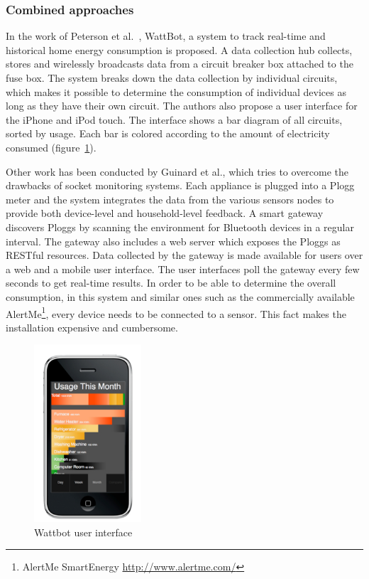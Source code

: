 \subsubsection{Combined approaches}
In the work of Peterson et al.~\cite{Petersen_2009}, WattBot, a system to track real-time and historical home energy consumption is proposed.  
A data collection hub collects, stores and wirelessly broadcasts data from a circuit breaker box attached to the fuse box. The system breaks down the data collection by individual circuits, which makes it possible to determine the consumption of individual devices as long as they have their own circuit. The authors also propose a user interface for the iPhone and iPod touch. The interface shows a bar diagram of all circuits, sorted by usage. Each bar is colored according to the amount of electricity consumed (figure~\ref{wattbot}).

Other work has been conducted by Guinard et al.\cite{weiss:inprocMUM:2010}, which tries to overcome the drawbacks of socket monitoring systems. Each appliance is plugged into a Plogg meter and the system integrates the data from the various sensors nodes to provide both device-level and household-level feedback. A smart gateway discovers Ploggs by scanning the environment for Bluetooth devices in a regular interval. The gateway also includes a web server which exposes the Ploggs as RESTful resources. Data collected by the gateway is made available for users over a web and a mobile user interface. The user interfaces poll the gateway every few seconds to get real-time results.   	
In order to be able to determine the overall consumption, in this system and similar ones such as the commercially available AlertMe\footnote{AlertMe SmartEnergy \url{http://www.alertme.com/}}, every device needs to be connected to a sensor. This fact makes the installation expensive and cumbersome. 

\begin{figure}[htbp]
\begin{center}
\includegraphics[width=4cm]{Images/wattbot.jpg}
\caption{Wattbot user interface}
\label{wattbot}
\end{center}
\end{figure} 
 

